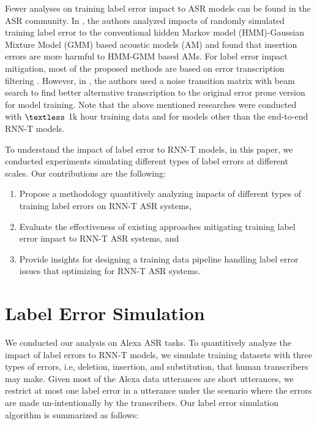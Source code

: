 \documentclass{article}
\begin{document}
Fewer analyses on training label error impact to ASR models can be found in the ASR community. In \cite{Sundaram}, the authors analyzed impacts of randomly simulated training label error to the conventional hidden Markov model (HMM)-Gaussian Mixture Model (GMM) based acoustic models (AM) and found that insertion errors are more harmful to HMM-GMM based AMs. For label error impact mitigation, most of the proposed methods are based on error transcription filtering \cite{Kurata2011,Wang}. However, in \cite{Dufraux2019}, the authors used a noise transition matrix with beam search to find better alternative transcription to the original error prone version for model training. Note that the above mentioned researches were conducted with $\textless$ 1k hour training data and for models other than the end-to-end RNN-T models.





To understand the impact of label error to RNN-T models, in this paper, we conducted experiments simulating different types of label errors at different scales. Our contributions are the following:
\begin{enumerate}
\item Propose a methodology quantitively analyzing impacts of different types of training label errors on RNN-T ASR systems,
\item Evaluate the effectiveness of existing approaches mitigating training label error impact to RNN-T ASR systems, and
\item Provide insights for designing a training data pipeline handling label error issues that optimizing for RNN-T ASR systems.
\end{enumerate}


\section{Label Error Simulation} \label{ler_sim}
We conducted our analysis on Alexa ASR tasks. To quantitively analyze the impact of label errors to RNN-T models, we simulate training datasets with three types of errors, i.e, deletion, insertion, and substitution, that human transcribers may make. Given most of the Alexa data utterances are short utterances, we restrict at most one label error in a utterance under the scenario where the errors are made un-intentionally by the transcribers. Our label error simulation algorithm is summarized as follows:
\end{document}
